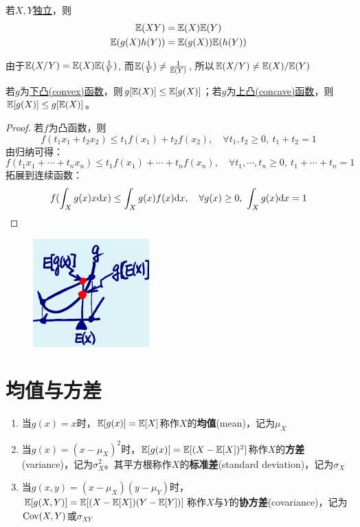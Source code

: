 \begin{proposition}[独立变量的期望]
    若$X,Y$\underline{独立}，则
    \begin{gather*}
        \mathbb{E}(XY)=\mathbb{E}(X)\mathbb{E}(Y) \\
        \mathbb{E}(g(X)h(Y))=\mathbb{E}(g(X))\mathbb{E}(h(Y))
    \end{gather*}
\end{proposition}

\begin{remark}
    由于$\mathbb{E}(X/Y)= \mathbb{E}(X)\mathbb{E}(\frac1{Y})$, 而$\mathbb{E}(\frac1{Y}) \neq \frac1{\mathbb{E}(Y)}$, 所以$\mathbb{E}(X/Y)\neq \mathbb{E}(X)/\mathbb{E}(Y)$
\end{remark}

\begin{theorem}[Jensen不等式]
    若$g$为\underline{下凸(convex)函数}，则$g[\mathbb{E}(X)] \le \mathbb{E}[g(X)]$；若$g$为\underline{上凸(concave)函数}，则$\mathbb{E}[g(X)] \le  g[\mathbb{E}(X)]$。
\end{theorem}
\begin{proof}
    若$f$为凸函数，则
    \[ f(t_1x_1+t_2x_2) \le t_1f(x_1)+t_2f(x_2) ,\quad \forall t_1,t_2 \ge 0 ,\ t_1+t_2=1 \]
    由归纳可得：
    \[ f(t_1x_1+ \cdots +t_nx_n) \le t_1f(x_1)+ \cdots +t_nf(x_n) ,\quad \forall t_1,\cdots ,t_n \ge 0 ,\ t_1+ \cdots +t_n=1 \]
    拓展到连续函数：
    \[ f(\int_{X}g(x)x \mathrm{d} x) \le \int_{X}g(x)f(x) \mathrm{d} x ,\quad \forall g(x) \ge 0 ,\ \int_{X}g(x) \mathrm{d} x=1 \]
\end{proof}

\begin{figure}[h]
    \centering
    \includegraphics{image/trans_mean.png}
\end{figure}

\section{均值与方差}

\begin{definition}
    \begin{enumerate}
        \item 当$g(x)=x$时，$\mathbb{E}[g(x)]=\mathbb{E}[X]$称作$X$的\textbf{均值}(mean)，记为$\mu_{X}$
        \item 当$g(x)=(x-\mu_{X})^{2}$时，$\mathbb{E}[g(x)]=\mathbb{E}[(X-\mathbb{E}[X])^{2}]$称作$X$的\textbf{方差}(variance)，记为$\sigma^2_{X}$。其平方根称作$X$的\textbf{标准差}(standard deviation)，记为$\sigma_{X}$
        \item 当$g(x,y)=(x-\mu_{X})(y-\mu_{Y})$时，$\mathbb{E}[g(X,Y)]=\mathbb{E}[(X-\mathbb{E}[X])(Y-\mathbb{E}[Y])]$称作$X$与$Y$的\textbf{协方差}(covariance)，记为$\operatorname{Cov}(X,Y)$或$\sigma_{XY}$
    \end{enumerate}
\end{definition}

